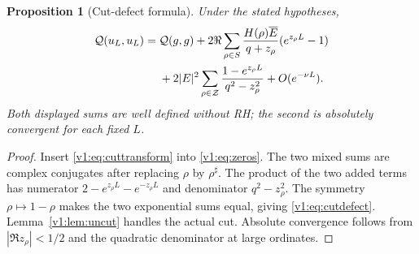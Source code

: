 \documentclass[11pt]{article}
\newtheorem{proposition}[theorem]{Proposition}
\theoremstyle{remark}
\newcommand{\Q}{\mathcal Q}
\newcommand{\Z}{\mathcal Z}
\begin{document}
\begin{proposition}[Cut-defect formula]\label{v1:prop:cut}
Under the stated hypotheses,
\begin{align}
 \Q(u_L,u_L)={}&\Q(g,g)
 +2\Re\sum_{\rho\in S}
 \frac{H(\rho)\overline E}{q+z_\rho}
          (e^{z_\rho L}-1)\notag\\
 &+2|E|^2\sum_{\rho\in\Z}
       \frac{1-e^{z_\rho L}}{q^2-z_\rho^2}
 +O(e^{-\nu L}).\label{v1:eq:cutdefect}
\end{align}
Both displayed sums are well defined without RH; the second is absolutely
convergent for each fixed $L$.
\end{proposition}
\begin{proof}
Insert \eqref{v1:eq:cuttransform} into \eqref{v1:eq:zeros}. The two mixed sums
are complex conjugates after replacing $\rho$ by $\rho^\sharp$.
The product of the two added terms has numerator
$2-e^{z_\rho L}-e^{-z_\rho L}$ and denominator $q^2-z_\rho^2$.
The symmetry $\rho\mapsto1-\rho$ makes the two exponential sums equal,
giving \eqref{v1:eq:cutdefect}. Lemma~\ref{v1:lem:uncut} handles the actual cut.
Absolute convergence follows from $|\Re z_\rho|<1/2$ and the quadratic
denominator at large ordinates.
\end{proof}
\end{document}
